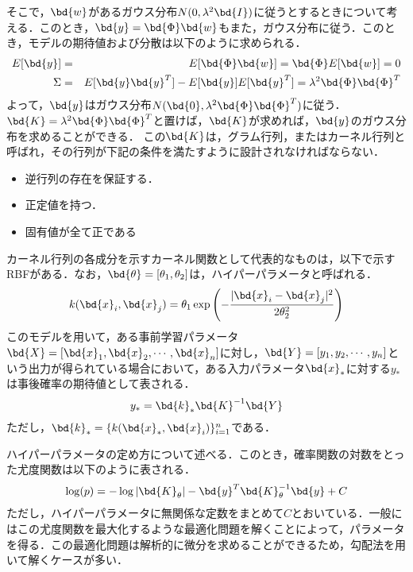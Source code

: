 		そこで，$ \bd{w} $があるガウス分布$ N(0,\lambda^2\bd{I}) $に従うとするときについて考える．このとき，$ \bd{y} = \bd{\Phi}\bd{w} $もまた，ガウス分布に従う．このとき，モデルの期待値および分散は以下のように求められる．
		\begin{eqnarray}\label{eq:VarandAvg}
			E[\bd{y}] &=& E[\bd{\Phi}\bd{w}] = \bd{\Phi}E[\bd{w}]=0\\
			\Sigma &=& E[\bd{y}\bd{y}^T]-	E[\bd{y}]E[\bd{y}^T] = \lambda^2\bd{\Phi}\bd{\Phi}^T
		\end{eqnarray}
		よって，$ \bd{y} $はガウス分布$ N(\bd{0},\lambda^2\bd{\Phi}\bd{\Phi}^T) $に従う．$ \bd{K} =  \lambda^2\bd{\Phi}\bd{\Phi}^T$と置けば，$ \bd{K} $が求めれば，$ \bd{y} $のガウス分布を求めることができる．
		この$ \bd{K} $は，グラム行列，またはカーネル行列と呼ばれ，その行列が下記の条件を満たすように設計されなければならない．
		\begin{itemize}
			\item 逆行列の存在を保証する．
			\item 正定値を持つ．
			\item 固有値が全て正である
		\end{itemize}
		カーネル行列の各成分を示すカーネル関数として代表的なものは，以下で示すRBFがある．なお，$ \bd{\theta} = [\theta_1,\theta_2] $は，ハイパーパラメータと呼ばれる．
		\begin{equation}\label{eq:Kernel}
			k(\bd{x}_i,\bd{x}_j) = \theta_1 \exp\left(- \frac{|\bd{x}_i-\bd{x}_j|^2}{2 \theta_2^2}\right)
		\end{equation}
		このモデルを用いて，ある事前学習パラメータ$ \bd{X}=[\bd{x}_1,\bd{x}_2,\cdots,\bd{x}_n] $に対し，$ \bd{Y}=[y_1,y_2,\cdots,y_n] $という出力が得られている場合において，ある入力パラメータ$ \bd{x}_* $に対する$ y_* $は事後確率の期待値として表される．
		\begin{equation}
			y_* = \bd{k}_* \bd{K}^{-1} \bd{Y}
		\end{equation}
		ただし，$ \bd{k}_* = \{k(\bd{x}_*,\bd{x}_i)\}_{i=1}^{n} $である．
		
		ハイパーパラメータの定め方について述べる．このとき，確率関数の対数をとった尤度関数は以下のように表される．
		\begin{equation}\label{eq:Suudo}
			\log(p) = -\log|\bd{K}_{\theta}| - \bd{y}^T \bd{K}_{\theta}^{-1} \bd{y}+C
		\end{equation}
		ただし，ハイパーパラメータに無関係な定数をまとめて$ C $とおいている．一般にはこの尤度関数を最大化するような最適化問題を解くことによって，パラメータを得る．この最適化問題は解析的に微分を求めることができるため，勾配法を用いて解くケースが多い．
